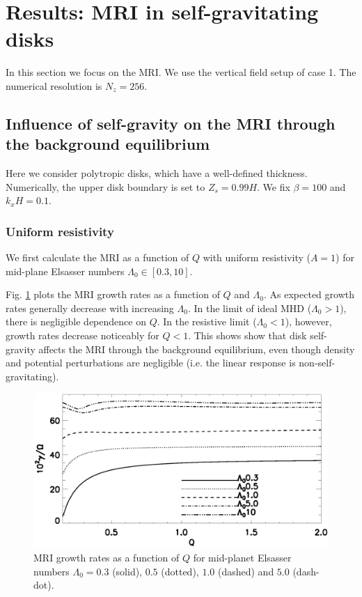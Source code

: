 \section{Results: MRI in self-gravitating disks}
In this section we focus on the MRI. We use the vertical field setup
of case 1. The numerical resolution is $N_z=256$.  

\subsection{Influence of self-gravity on the MRI through the
  background equilibrium}

Here we consider polytropic disks, which have a well-defined
thickness. Numerically, the upper disk boundary is set to
$Z_s=0.99H$. We fix $\beta=100$ and $k_xH=0.1$.  


\subsubsection{Uniform
  resistivity}  
We first calculate the MRI as a function of $Q$ with uniform
resistivity ($A=1$) for mid-plane Elsasser numbers $\Lambda_0\in[0.3,10]$.    

Fig. \ref{compare_growth_poly_uniresis} plots the MRI growth rates as
a function of $Q$ and $\Lambda_0$. As expected growth rates generally
decrease with increasing $\Lambda_0$. In the limit of ideal MHD ($\Lambda_0>1$), 
there is negligible dependence on $Q$. In the resistive limit
($\Lambda_0<1$), however, growth rates decrease noticeably for $Q<1$. This shows
show that disk self-gravity affects the MRI through the background
equilibrium, even though density and potential perturbations are  
negligible (i.e. the linear response is
non-self-gravitating).    
 
\begin{figure}
  \includegraphics[width=\linewidth]{figures/compare_growth_poly_uniresis2}
  \caption{MRI growth rates as a function of $Q$ for mid-planet
    Elsasser numbers $\Lambda_0=0.3$ (solid), $0.5$ (dotted), $1.0$
    (dashed) and $5.0$ (dash-dot).  
    \label{compare_growth_poly_uniresis}}
\end{figure}

